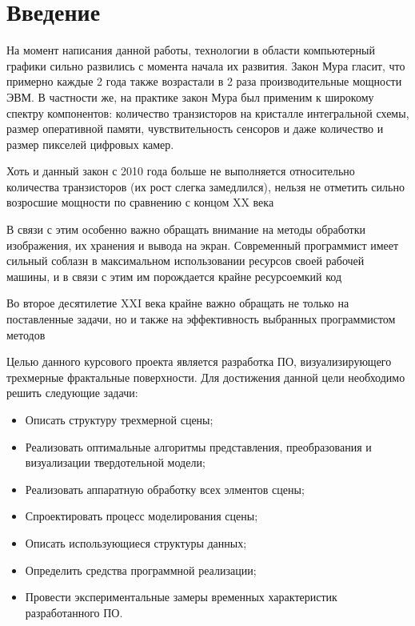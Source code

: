 \chapter*{Введение}

На момент написания данной работы, технологии в области компьютерный графики сильно развились с момента начала их развития. Закон Мура гласит, что примерно каждые 2 года также возрастали в 2 раза производительные мощности ЭВМ. В частности же, на практике закон Мура был применим к широкому спектру компонентов: количество транзисторов на кристалле интегральной схемы, размер оперативной памяти, чувствительность сенсоров и даже количество и размер пикселей цифровых камер.

Хоть и данный закон с 2010 года больше не выполняется относительно количества транзисторов (их рост слегка замедлился), нельзя не отметить сильно возросшие мощности по сравнению с концом XX века

В связи с этим особенно важно обращать внимание на методы обработки изображения, их хранения и вывода на экран. Современный программист имеет сильный соблазн в максимальном использовании ресурсов своей рабочей машины, и в связи с этим им порождается крайне ресурсоемкий код

Во второе десятилетие XXI века крайне важно обращать не только на поставленные задачи, но и также на эффективность выбранных программистом методов

Целью данного курсового проекта является разработка ПО, визуализирующего трехмерные фрактальные поверхности.
Для достижения данной цели необходимо решить следующие задачи:
\begin{itemize}
    \item Описать структуру трехмерной сцены;
    \item Реализовать оптимальные алгоритмы представления, преобразования и визуализации твердотельной модели;
    \item Реализовать аппаратную обработку всех элментов сцены;
    \item Спроектировать процесс моделирования сцены;
    \item Описать использующиеся структуры данных;
    \item Определить средства программной реализации;
    \item Провести экспериментальные замеры временных характеристик разработанного ПО.
\end{itemize}
